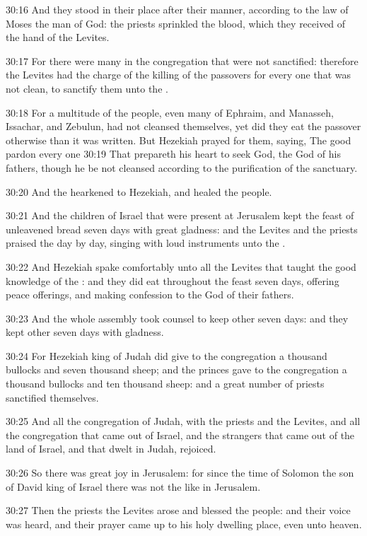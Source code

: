 30:16 And they stood in their place after their manner, according to the law of Moses the man of God: the priests sprinkled the blood, which they received of the hand of the Levites.

30:17 For there were many in the congregation that were not sanctified: therefore the Levites had the charge of the killing of the passovers for every one that was not clean, to sanctify them unto the \LORD.

30:18 For a multitude of the people, even many of Ephraim, and Manasseh, Issachar, and Zebulun, had not cleansed themselves, yet did they eat the passover otherwise than it was written. But Hezekiah prayed for them, saying, The good \LORD pardon every one 30:19 That prepareth his heart to seek God, the \LORD God of his fathers, though he be not cleansed according to the purification of the sanctuary.

30:20 And the \LORD hearkened to Hezekiah, and healed the people.

30:21 And the children of Israel that were present at Jerusalem kept the feast of unleavened bread seven days with great gladness: and the Levites and the priests praised the \LORD day by day, singing with loud instruments unto the \LORD.

30:22 And Hezekiah spake comfortably unto all the Levites that taught the good knowledge of the \LORD: and they did eat throughout the feast seven days, offering peace offerings, and making confession to the \LORD God of their fathers.

30:23 And the whole assembly took counsel to keep other seven days: and they kept other seven days with gladness.

30:24 For Hezekiah king of Judah did give to the congregation a thousand bullocks and seven thousand sheep; and the princes gave to the congregation a thousand bullocks and ten thousand sheep: and a great number of priests sanctified themselves.

30:25 And all the congregation of Judah, with the priests and the Levites, and all the congregation that came out of Israel, and the strangers that came out of the land of Israel, and that dwelt in Judah, rejoiced.

30:26 So there was great joy in Jerusalem: for since the time of Solomon the son of David king of Israel there was not the like in Jerusalem.

30:27 Then the priests the Levites arose and blessed the people: and their voice was heard, and their prayer came up to his holy dwelling place, even unto heaven.

